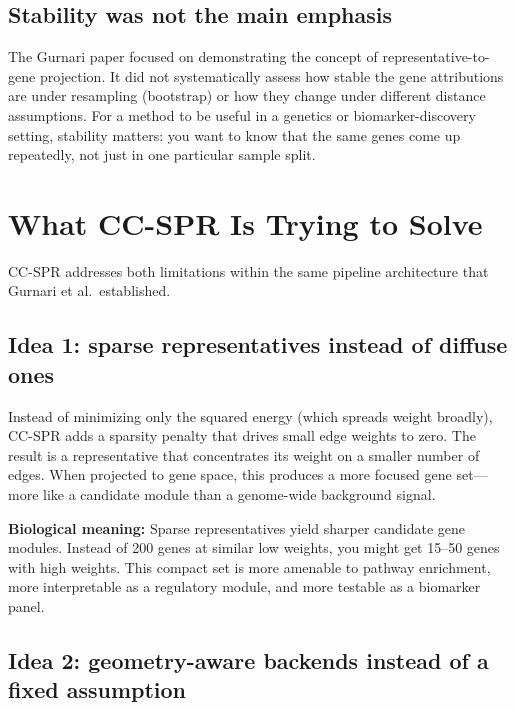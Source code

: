 \documentclass[11pt]{article}
\makeatletter
\newenvironment{biobox}{%
  \par\vspace{8pt}\noindent\fboxrule=1pt\fboxsep=8pt%
  \begin{lrbox}{\@tempboxa}\begin{minipage}{\dimexpr\linewidth-2\fboxsep-2\fboxrule}}%
  {\end{minipage}\end{lrbox}\fcolorbox{green!40!black}{white}{\usebox{\@tempboxa}}\par\vspace{8pt}}
\makeatother
\begin{document}
\subsection{Stability was not the main emphasis}

The Gurnari paper focused on demonstrating the concept of representative-to-gene projection.
It did not systematically assess how stable the gene attributions are under resampling (bootstrap) or how they change under different distance assumptions.
For a method to be useful in a genetics or biomarker-discovery setting, stability matters: you want to know that the same genes come up repeatedly, not just in one particular sample split.

\section{What CC-SPR Is Trying to Solve}
\label{sec:whatccspr}

CC-SPR addresses both limitations within the same pipeline architecture that Gurnari et al.\ established.

\subsection{Idea 1: sparse representatives instead of diffuse ones}

Instead of minimizing only the squared energy (which spreads weight broadly), CC-SPR adds a sparsity penalty that drives small edge weights to zero.
The result is a representative that concentrates its weight on a smaller number of edges.
When projected to gene space, this produces a more focused gene set---more like a candidate module than a genome-wide background signal.

\begin{biobox}
\textbf{Biological meaning:} Sparse representatives yield sharper candidate gene modules.
Instead of 200 genes at similar low weights, you might get 15--50 genes with high weights.
This compact set is more amenable to pathway enrichment, more interpretable as a regulatory module, and more testable as a biomarker panel.
\end{biobox}

\subsection{Idea 2: geometry-aware backends instead of a fixed assumption}
\end{document}
